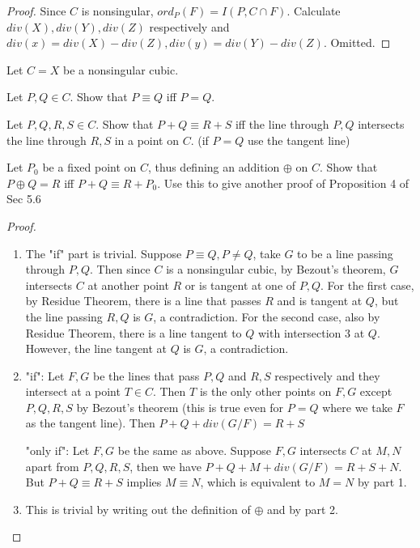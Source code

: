 \documentclass{solution}
\begin{document}
\begin{proof}
    Since $C$ is nonsingular, $ord_P(F) = I(P, C \cap F)$. Calculate $div(X), div(Y), div(Z)$ respectively and $div(x) = div(X) - div(Z), div(y) = div(Y) - div(Z)$. Omitted.
\end{proof}

\begin{problem}{8.3}
    Let $C = X$ be a nonsingular cubic. \begin{inparaenum}
        \item Let $P, Q \in C$. Show that $P \equiv Q$ iff $P = Q$.
        \item Let $P, Q, R, S \in C$. Show that $P + Q \equiv R + S$ iff the line through $P, Q$ intersects the line through $R, S$ in a point on $C$. (if $P = Q$ use the tangent line)
        \item Let $P_0$ be a fixed point on $C$, thus defining an addition $\oplus$ on $C$. Show that $P \oplus Q = R$ iff $P + Q \equiv R + P_0$. Use this to give another proof of Proposition 4 of Sec 5.6
    \end{inparaenum}
\end{problem}

\begin{proof}
    \begin{enumerate}
        \item The "if" part is trivial. Suppose $P \equiv Q, P \ne Q$, take $G$ to be a line passing through $P, Q$. Then since $C$ is a nonsingular cubic, by Bezout's theorem, $G$ intersects $C$ at another point $R$ or is tangent at one of $P, Q$. For the first case, by Residue Theorem, there is a line that passes $R$ and is tangent at $Q$, but the line passing $R, Q$ is $G$, a contradiction. For the second case, also by Residue Theorem, there is a line tangent to $Q$ with intersection $3$ at $Q$. However, the line tangent at $Q$ is $G$, a contradiction.
        \item "if": Let $F, G$ be the lines that pass $P, Q$ and $R, S$ respectively and they intersect at a point $T \in C$. Then $T$ is the only other points on $F, G$ except $P, Q, R, S$ by Bezout's theorem (this is true even for $P = Q$ where we take $F$ as the tangent line). Then $P + Q + div(G / F) = R + S$
        
        "only if": Let $F, G$ be the same as above. Suppose $F, G$ intersects $C$ at $M, N$ apart from $P, Q, R, S$, then we have $P + Q + M + div(G / F) = R + S + N$. But $P + Q \equiv R + S$ implies $M \equiv N$, which is equivalent to $M = N$ by part 1.
        \item This is trivial by writing out the definition of $\oplus$ and by part 2.
    \end{enumerate}
\end{proof}
\end{document}
